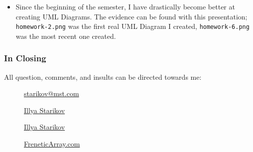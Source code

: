 \documentclass[xclolor=dvipsnames]{beamer}            %
\begin{document}
\begin{darkframes}
\begin{frame}
        \begin{itemize}
            \item Since the beginning of the semester, I have drastically become better at creating UML Diagrams. The evidence can be found with this presentation; \texttt{homework-2.png} was the first real UML Diagram I created, \texttt{homework-6.png} was the most recent one created.
        \end{itemize}
    \end{frame}

    \begin{frame}
        \frametitle{In Closing}

        All question, comments, and insults can be directed towards me:

        \begin{center}
            \begin{description}
                \item[\faComment] \href{mailto:starikov@mst.edu}{starikov@mst.com}
                \item[\faLinkedin] \href{https://www.linkedin.com/in/illyastarikov/}{Illya Starikov}
                \item[\faGithub] \href{https://github.com/IllyaStarikov/}{Illya Starikov}
                \item[\faRss] \href{https://freneticarray.com/}{FreneticArray.com}
            \end{description}
        \end{center}
    \end{frame}
\end{darkframes}
\end{document}
